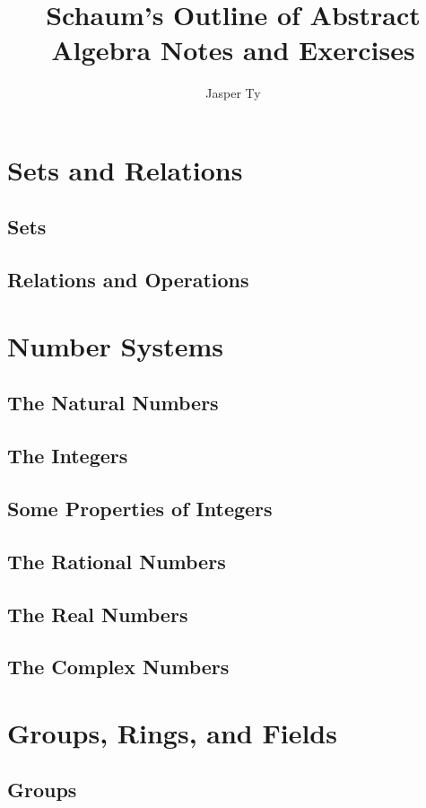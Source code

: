 \documentclass{book}
\begin{document}
\title{Schaum's Outline of Abstract Algebra Notes and Exercises}
\author{Jasper Ty}
\date{}
\maketitle

\tableofcontents

\part{Sets and Relations}
\chapter{Sets}


\chapter{Relations and Operations}

\part{Number Systems}
\chapter{The Natural Numbers}
\chapter{The Integers}
\chapter{Some Properties of Integers}
\chapter{The Rational Numbers}
\chapter{The Real Numbers}
\chapter{The Complex Numbers}

\part{Groups, Rings, and Fields}
\chapter{Groups}


\end{document}
